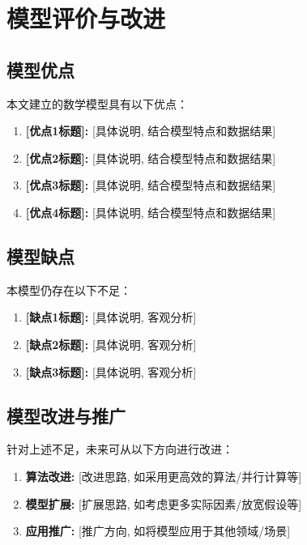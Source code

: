 
\section{模型评价与改进}

\subsection{模型优点}

本文建立的数学模型具有以下优点：

\begin{enumerate}
    \item \textbf{[优点1标题]:} [具体说明, 结合模型特点和数据结果]
    \item \textbf{[优点2标题]:} [具体说明, 结合模型特点和数据结果]
    \item \textbf{[优点3标题]:} [具体说明, 结合模型特点和数据结果]
    \item \textbf{[优点4标题]:} [具体说明, 结合模型特点和数据结果]
\end{enumerate}

\subsection{模型缺点}

本模型仍存在以下不足：

\begin{enumerate}
    \item \textbf{[缺点1标题]:} [具体说明, 客观分析]
    \item \textbf{[缺点2标题]:} [具体说明, 客观分析]
    \item \textbf{[缺点3标题]:} [具体说明, 客观分析]
\end{enumerate}

\subsection{模型改进与推广}

针对上述不足，未来可从以下方向进行改进：

\begin{enumerate}
    \item \textbf{算法改进:} [改进思路, 如采用更高效的算法/并行计算等]
    \item \textbf{模型扩展:} [扩展思路, 如考虑更多实际因素/放宽假设等]
    \item \textbf{应用推广:} [推广方向, 如将模型应用于其他领域/场景]
\end{enumerate}

